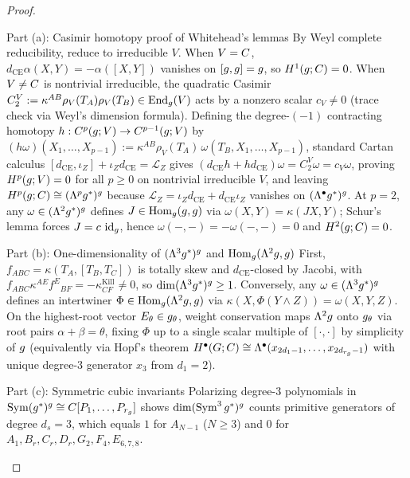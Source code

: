 \begin{proof}\leavevmode
\begin{proofpart}{Part (a): Casimir homotopy proof of Whitehead's lemmas}
By Weyl complete reducibility, reduce to irreducible $V$. When $V = C$, $d_{\mathrm{CE}}\alpha(X,Y) = -\alpha([X,Y])$ vanishes on $[g,g] = g$, so $H^1(g;C) = 0$. When $V \neq C$ is nontrivial irreducible, the quadratic Casimir $C_2^V := \kappa^{AB}\rho_V(T_A)\rho_V(T_B) \in \operatorname{End}_{g}(V)$ acts by a nonzero scalar $c_V \neq 0$ (trace check via Weyl's dimension formula). Defining the degree-$(-1)$ contracting homotopy $h : C^p(g;V) \to C^{p-1}(g;V)$ by $(h\omega)(X_1,\dots,X_{p-1}) := \kappa^{AB}\rho_V(T_A)\,\omega(T_B, X_1,\dots,X_{p-1})$, standard Cartan calculus $[d_{\mathrm{CE}},\iota_Z] + \iota_Z d_{\mathrm{CE}} = \mathcal{L}_Z$ gives $(d_{\mathrm{CE}}h + h d_{\mathrm{CE}})\omega = C_2^V\omega = c_V\omega$, proving $H^p(g;V) = 0$ for all $p \ge 0$ on nontrivial irreducible $V$, and leaving $H^p(g;C) \cong (\Lambda^pg^*)^{g}$ because $\mathcal{L}_Z = \iota_Z d_{\mathrm{CE}} + d_{\mathrm{CE}}\iota_Z$ vanishes on $(\Lambda^\bullet g^*)^{g}$. At $p=2$, any $\omega \in (\Lambda^2g^*)^{g}$ defines $J \in \operatorname{Hom}_{g}(g,g)$ via $\omega(X,Y) = \kappa(JX,Y)$; Schur's lemma forces $J = c\,\operatorname{id}_{g}$, hence $\omega(-,-) = -\omega(-,-) = 0$ and $H^2(g;C) = 0$.
\end{proofpart}
\begin{proofpart}{Part (b): One-dimensionality of $(\Lambda^3g^*)^{g}$ and $\operatorname{Hom}_{g}(\Lambda^2g,g)$}
First, $f_{ABC} = \kappa(T_A,[T_B,T_C])$ is totally skew and $d_{\mathrm{CE}}$-closed by Jacobi, with $f_{ABC}\kappa^{AE}f^E{}_{BF} = -\kappa^{\mathrm{Kill}}_{CF} \neq 0$, so $\dim(\Lambda^3g^*)^{g} \ge 1$. Conversely, any $\omega \in (\Lambda^3g^*)^{g}$ defines an intertwiner $\Phi \in \operatorname{Hom}_{g}(\Lambda^2g,g)$ via $\kappa(X,\Phi(Y\wedge Z)) = \omega(X,Y,Z)$. On the highest-root vector $E_\theta \in g_\theta$, weight conservation maps $\Lambda^2g$ onto $g_\theta$ via root pairs $\alpha + \beta = \theta$, fixing $\Phi$ up to a single scalar multiple of $[\cdot,\cdot]$ by simplicity of $g$ (equivalently via Hopf's theorem $H^\bullet(G;C) \cong \Lambda^\bullet(x_{2d_1-1},\dots,x_{2d_{r_{g}}-1})$ with unique degree-$3$ generator $x_3$ from $d_1 = 2$).
\end{proofpart}
\begin{proofpart}{Part (c): Symmetric cubic invariants}
Polarizing degree-$3$ polynomials in $\operatorname{Sym}(g^*)^{g} \cong C[P_1,\dots,P_{r_{g}}]$ shows $\dim(\operatorname{Sym}^3g^*)^{g}$ counts primitive generators of degree $d_s = 3$, which equals $1$ for $A_{N-1}$ ($N \ge 3$) and $0$ for $A_1, B_r, C_r, D_r, G_2, F_4, E_{6,7,8}$.
\end{proofpart}
\end{proof}


